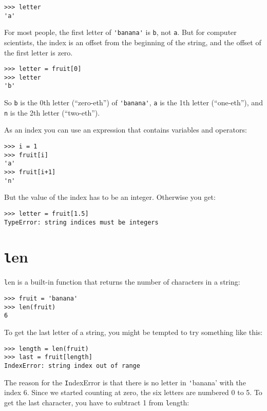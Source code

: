 \documentclass[
DIV=11,
fontsize=13,
twoside,
headinclude=false,
titlepage=firstiscover,
abstract=true,
headsepline=true,
footsepline=true,
chapterprefix=true, %
headings=big,
bibliography=totoc,%
captions=tableheading
]{scrbook}
\theoremstyle{definition}
\begin{document}
\begin{lstlisting}
>>> letter
'a'
\end{lstlisting}
%
For most people, the first letter of \verb"'banana'" is {\texttt b}, not
{\texttt a}.  But for computer scientists, the index is an offset from the
beginning of the string, and the offset of the first letter is zero.

\begin{lstlisting}
>>> letter = fruit[0]
>>> letter
'b'
\end{lstlisting}
%
So {\texttt b} is the 0th letter (``zero-eth'') of \verb"'banana'", {\texttt
  a} is the 1th letter (``one-eth''), and {\texttt n} is the 2th letter
(``two-eth'').   

As an index you can use an expression that contains variables and
operators:

\begin{lstlisting}
>>> i = 1
>>> fruit[i]
'a'
>>> fruit[i+1]
'n'
\end{lstlisting}
%

But the value of the index has to be an integer.  Otherwise you
get:

\begin{lstlisting}
>>> letter = fruit[1.5]
TypeError: string indices must be integers
\end{lstlisting}
%

\section{{\texttt len}}

{\texttt len} is a built-in function that returns the number of characters
in a string:

\begin{lstlisting}
>>> fruit = 'banana'
>>> len(fruit)
6
\end{lstlisting}
%
To get the last letter of a string, you might be tempted to try something
like this:

\begin{lstlisting}
>>> length = len(fruit)
>>> last = fruit[length]
IndexError: string index out of range
\end{lstlisting}
%
The reason for the {\texttt IndexError} is that there is no letter in {\texttt
'banana'} with the index 6.  Since we started counting at zero, the
six letters are numbered 0 to 5.  To get the last character, you have
to subtract 1 from {\texttt length}:
\end{document}
